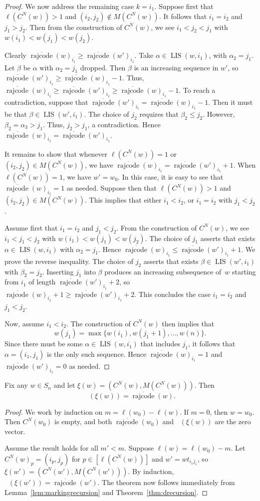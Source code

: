 \documentclass[ALCO]{cedram}
\DeclareMathOperator{\LIS}{\mathrm{LIS}}
\DeclareMathOperator{\dwt}{\overline{\mathrm{wt}}}
\DeclareMathOperator{\rr}{\mathrm{rajcode}}
\newcommand{\orr}{\overline{\rr}}
\newcommand{\CN}{C^N}
\begin{document}
\begin{proof}
	We now address the remaining case $k=i_1$. Suppose first that $\ell(\CN(w))>1$ and $(i_2,j_2)\notin M(\CN(w))$. It follows that $i_1=i_2$ and $j_1>j_2$. Then from the construction of $\CN(w)$, we see $i_1<j_2<j_1$ with $w(i_1)<w(j_1)<w(j_2)$. 
	
	Clearly $\orr(w)_{i_1}\geq \orr(w')_{i_1}$. Take $\alpha \in \LIS(w,i_1)$, with $\alpha_2=j_1$. Let $\beta$ be $\alpha$ with $\alpha_2=j_1$ dropped. Then $\beta$ is an increasing sequence in $w'$, so $\orr(w')_{i_1}\geq \orr(w)_{i_1}-1$. Thus, $\orr(w)_{i_1}\geq \orr(w')_{i_1}\geq \orr(w)_{i_1}-1$. To reach a contradiction, suppose that $\orr(w')_{i_1}= \orr(w)_{i_1}-1$. Then it must be that $\beta\in \LIS(w',i_1)$. The choice of $j_2$ requires that $\beta_2\leq j_2$. However, $\beta_2=\alpha_3>j_1$. Thus, $j_2>j_1$, a contradiction. Hence $\orr(w)_{i_1} = \orr(w')_{i_1}$.
	
	It remains to show that whenever $\ell(\CN(w))=1$ or $(i_2,j_2)\in M(\CN(w))$, we have $\orr(w)_{i_1} = \orr(w')_{i_1}+1$. When $\ell(\CN(w))=1$, we have $w'=w_0$. In this case, it is easy to see that $\orr(w)_{i_1}=1$ as needed. Suppose then that $\ell(\CN(w))>1$ and $(i_2,j_2)\in M(\CN(w))$. This implies that either $i_1<i_2$, or $i_1=i_2$ with $j_1<j_2$.
	
	Assume first that $i_1=i_2$ and $j_1<j_2$. From the construction of $\CN(w)$, we see $i_1<j_1<j_2$ with $w(i_1)<w(j_1)<w(j_2)$. 
	The choice of $j_1$ asserts that exists $\alpha\in \LIS(w,i_1)$ with $\alpha_2=j_1$. Hence $\orr(w)_{i_1}\leq \orr(w')_{i_1}+1$. We prove the reverse inequality. The choice of $j_2$ asserts that exists $\beta\in \LIS(w',i_1)$ with $\beta_2=j_2$. Inserting $j_1$ into $\beta$ produces an increasing subsequence of~$w$ starting from $i_1$ of length $\orr(w')_{i_1}+2$, so $\orr(w)_{i_1}+1\geq \orr(w')_{i_1}+2$. This concludes the case $i_1=i_2$ and $j_1<j_2$.
	
	Now, assume $i_1<i_2$. The construction of $\CN(w)$ then implies that 
	\[w(j_1) = \max\{w(i_1),w(j_1+1),\ldots, w(n) \}.\] 
	Since there must be some $\alpha\in \LIS(w,i_1)$ that includes $j_1$, it follows that $\alpha = (i_1,j_1)$ is the only such sequence. Hence $\orr(w)_{i_1} = 1$ and $\orr(w')_{i_1} =0$ as needed.
\end{proof}

\begin{theorem}
	\label{thm:strongequality}
	Fix any $w\in S_n$ and let $\xi(w)=(\CN(w),M(\CN(w)))$. Then \[\dwt(\xi(w)) = \orr(w).\]
\end{theorem}
\begin{proof}
	We work by induction on $m=\ell(w_0)-\ell(w)$. If $m=0$, then $w=w_0$. Then $\CN(w_0)$ is empty, and both $\orr(w_0)$ and $\dwt(\xi(w))$ are the zero vector.
	
	Assume the result holds for all $m'<m$. Suppose $\ell(w)=\ell(w_0)-m$. Let $\CN(w)_p=(i_p,j_p)$ for $p\in [\ell(\CN(w))]$ and $w'=wt_{i_1j_1}$, so $\xi(w')=(\CN(w'),M(\CN(w')))$. By induction, $\dwt(\xi(w')) = \orr(w')$. The theorem now follows immediately from Lemma~\ref{lem:markingrecursion} and Theorem~\ref{thm:drecursion}.
\end{proof}
\end{document}
